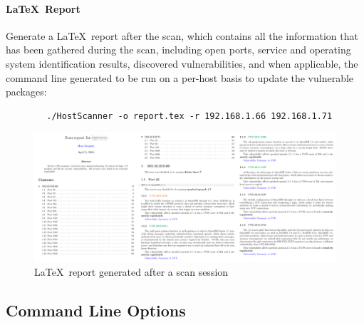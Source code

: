 \documentclass[a4paper,12pt]{article}
\begin{document}
	\vspace{-0.25in}
	\paragraph*{\LaTeX\ Report} Generate a \LaTeX\ report after the scan, which contains all the information that has been gathered during the scan, including open ports, service and operating system identification results, discovered vulnerabilities, and when applicable, the command line generated to be run on a per-host basis to update the vulnerable packages:

	\begin{listing}[H]
	\begin{verbatim}
		./HostScanner -o report.tex -r 192.168.1.66 192.168.1.71
	\end{verbatim}
	\end{listing}

	\begin{figure}[!htbp]
		\centering
		\includegraphics[scale=0.07]{reportcap.png}
		\caption{\LaTeX\ report generated after a scan session}
		\label{latexrep}
	\end{figure}
	
\subsection{Command Line Options} \label{cliopts}
 
\end{document}

